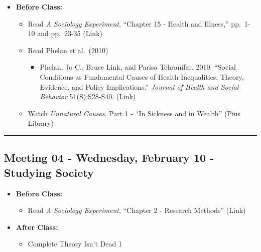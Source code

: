 \documentclass[
]{book}
\providecommand{\tightlist}{%
  \setlength{\itemsep}{0pt}\setlength{\parskip}{0pt}}
\begin{document}
\begin{itemize}
\tightlist
\item
  \textbf{Before Class:}

  \begin{itemize}
  \tightlist
  \item
    Read \emph{A Sociology Experiment}, ``Chapter 15 - Health and Illness,'' pp.~1-10 and pp.~23-35 (Link)
  \item
    Read Phelan et al.~(2010)

    \begin{itemize}
    \tightlist
    \item
      Phelan, Jo C., Bruce Link, and Parisa Tehranifar. 2010. ``Social Conditions as Fundamental Causes of Health Inequalities: Theory, Evidence, and Policy Implications.'' \emph{Journal of Health and Social Behavior} 51(S):S28-S40. (Link)
    \end{itemize}
  \item
    Watch \emph{Unnatural Causes}, Part 1 - ``In Sickness and in Wealth'' (Pius Library)
  \end{itemize}
\end{itemize}

\begin{center}\rule{0.5\linewidth}{0.5pt}\end{center}

\hypertarget{meeting-04---wednesday-february-10---studying-society}{%
\subsection*{Meeting 04 - Wednesday, February 10 - Studying Society}\label{meeting-04---wednesday-february-10---studying-society}}

\begin{itemize}
\tightlist
\item
  \textbf{Before Class:}

  \begin{itemize}
  \tightlist
  \item
    Read \emph{A Sociology Experiment}, ``Chapter 2 - Research Methods'' (Link)
  \end{itemize}
\item
  \textbf{After Class:}

  \begin{itemize}
  \tightlist
  \item
    Complete Theory Isn't Dead 1
  \end{itemize}
\end{itemize}
\end{document}
